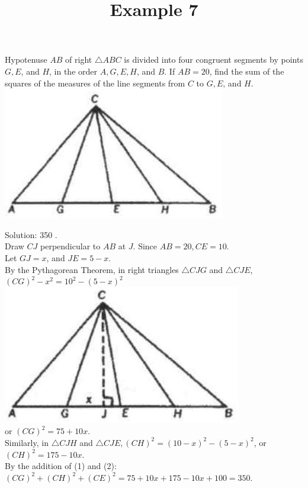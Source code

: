 \documentclass{article}
\title{Example 7}
\date{}
\begin{document}
\maketitle

Hypotenuse \(A B\) of right \(\triangle A B C\) is divided into four congruent segments by points \(G, E\), and \(H\), in the order \(A, G, E, H\), and \(B\). If \(A B=20\), find the sum of the squares of the measures of the line segments from \(C\) to \(G, E\), and \(H\).\\
\centering
\includegraphics[width=\textwidth]{images/problem_image_1.jpg}

Solution: 350 .\\
Draw \(C J\) perpendicular to \(A B\) at \(J\). Since \(A B=20, C E=10\).\\
Let \(G J=x\), and \(J E=5-x\).\\
By the Pythagorean Theorem, in right triangles \(\triangle C J G\) and \(\triangle C J E\),\\
\((C G)^{2}-x^{2}=10^{2}-(5-x)^{2}\)\\
\centering
\includegraphics[width=\textwidth]{images/reasoning_image_1.jpg}\\
or \((C G)^{2}=75+10 x\).\\
Similarly, in \(\triangle C J H\) and \(\triangle C J E,(C H)^{2}=(10-x)^{2}-(5-x)^{2}\), or \((C H)^{2}=175-10 x\).\\
By the addition of (1) and (2):\\
\((C G)^{2}+(C H)^{2}+(C E)^{2}=75+10 x+175-10 x+100=350\).
\end{document}
